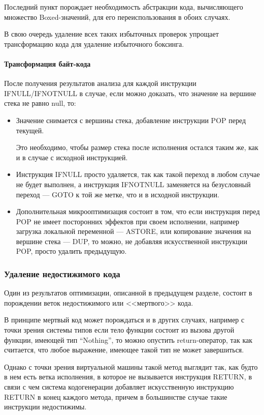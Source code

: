Последний пункт порождает необходимость абстракции кода, вычисляющего множество Boxed-значений,
для его переиспользования в обоих случаях.

В свою очередь удаление всех таких избыточных проверок упрощает трансформацию кода для
удаление избыточного боксинга.

\paragraph{Трансформация байт-кода}
После получения результатов анализа для каждой инструкции IFNULL/IFNOTNULL в случае, если можно
доказать, что значение на вершине стека не равно null, то:
\begin{itemize}
    \item Значение снимается с вершины стека, добавление инструкции POP перед текущей.

    Это необходимо, чтобы размер стека после исполнения остался таким же, как и в случае
    с исходной инструкцией.

    \item Инструкция IFNULL просто удаляется, так как такой переход в любом случае не будет
    выполнен, а инструкция IFNOTNULL заменяется на безусловный переход --- GOTO к той же метке,
    что и в исходной инструкции.

    \item Дополнительная микрооптимизация состоит в том, что если инструкция перед POP не имеет
    посторонних эффектов при своем исполнении, например загрузка локальной переменной --- ASTORE,
    или копирование значения на вершине стека --- DUP, то можно, не добавляя искусственной инструкции
    POP, просто удалить предыдущую.
\end{itemize}

\subsubsection{Удаление недостижимого кода}
Один из результатов оптимизации, описанной в предыдущем разделе, состоит в порождении веток
недостижимого или <<мертвого>> кода.

В принципе мертвый код может порождаться и в других случаях, например с точки зрения системы типов
если тело функции состоит из вызова другой функции, имеющей тип ``Nothing'', то можно опустить
return-оператор, так как считается, что любое выражение, имеющее такой тип не может завершиться.

Однако с точки зрения виртуальной машины такой метод выглядит так, как будто в нем есть ветка
исполнения, в которое не вызывается инструкция RETURN, в связи с чем система кодогенерации
добавляет искусственную инструкцию RETURN в конец каждого метода, причем в большинстве
случае такие инструкции недостижимы.


